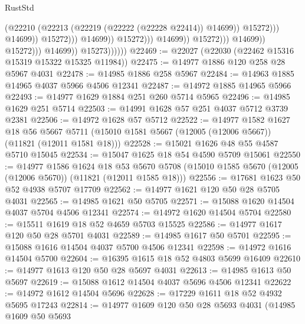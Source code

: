 \begin{lexlean}{RustStd}
\begin{coremodule}
                                                                (@22210
                                                                  (@22213
                                                                    (@22219
                                                                      (@22222 (@22228 @22414))
                                                                      @14699))
                                                                  @15272)))
                                                            @14699))
                                                        @15272)))
                                                  @14699))
                                              @15272)))
                                        @14699))
                                    @15272)))
                              @14699))
                          @15272)))
                    @14699))
                @15273))))))
@22469 := @22027 (@22030 (@22462 @15316 @15319 @15322 @15325 @11984))
@22475 := @14977 @1886 @120 @258 @28 @5967 @4031
@22478 := @14985 @1886 @258 @5967
@22484 := @14963 @1885 @14965 @4037 @5966 @4506 @12341
@22487 := @14972 @1885 @14965 @5966
@22493 := @14977 @1629 @1884 @251 @260 @5714 @5965
@22496 := @14985 @1629 @251 @5714
@22503 := @14991 @1628 @57 @251 @4037 @5712 @3739 @2381
@22506 := @14972 @1628 @57 @5712
@22522 := @14977
    @1582
    @1627
    @18
    @56
    @5667
    @5711
    (@15010 @1581 @5667 (@12005 (@12006 @5667)) (@11821 (@12011 @1581 @18)))
@22528 := @15021 @1626 @48 @55 @4587 @5710 @15045
@22534 := @15047 @1625 @18 @54 @4590 @5709 @15061
@22550 := @14977
    @1586
    @1624
    @18
    @53
    @5670
    @5708
    (@15010 @1585 @5670 (@12005 (@12006 @5670)) (@11821 (@12011 @1585 @18)))
@22556 := @17681 @1623 @50 @52 @4938 @5707 @17709
@22562 := @14977 @1621 @120 @50 @28 @5705 @4031
@22565 := @14985 @1621 @50 @5705
@22571 := @15088 @1620 @14504 @4037 @5704 @4506 @12341
@22574 := @14972 @1620 @14504 @5704
@22580 := @15511 @1619 @18 @52 @4659 @5703 @15525
@22586 := @14977 @1617 @120 @50 @28 @5701 @4031
@22589 := @14985 @1617 @50 @5701
@22595 := @15088 @1616 @14504 @4037 @5700 @4506 @12341
@22598 := @14972 @1616 @14504 @5700
@22604 := @16395 @1615 @18 @52 @4803 @5699 @16409
@22610 := @14977 @1613 @120 @50 @28 @5697 @4031
@22613 := @14985 @1613 @50 @5697
@22619 := @15088 @1612 @14504 @4037 @5696 @4506 @12341
@22622 := @14972 @1612 @14504 @5696
@22628 := @17229 @1611 @18 @52 @4932 @5695 @17243
@22814 := @14977
    @1609
    @120
    @50
    @28
    @5693
    @4031
    (@14985
      @1609
      @50
      @5693

\end{coremodule}
\end{lexlean}
